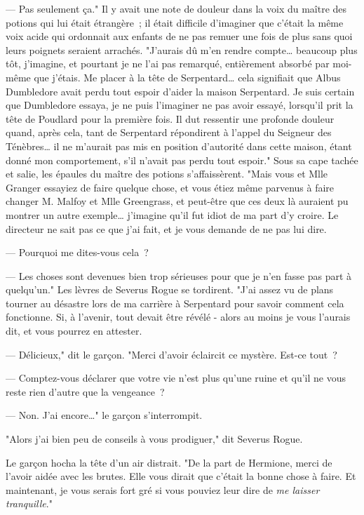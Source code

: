 --- Pas seulement ça." Il y avait une note de douleur dans la voix du maître des potions qui lui était étrangère~; il était difficile d'imaginer que c'était la même voix acide qui ordonnait aux enfants de ne pas remuer une fois de plus sans quoi leurs poignets seraient arrachés. "J'aurais dû m'en rendre compte… beaucoup plus tôt, j'imagine, et pourtant je ne l'ai pas remarqué, entièrement absorbé par moi-même que j'étais. Me placer à la tête de Serpentard… cela signifiait que Albus Dumbledore avait perdu tout espoir d'aider la maison Serpentard. Je suis certain que Dumbledore essaya, je ne puis l'imaginer ne pas avoir essayé, lorsqu'il prit la tête de Poudlard pour la première fois. Il dut ressentir une profonde douleur quand, après cela, tant de Serpentard répondirent à l'appel du Seigneur des Ténèbres… il ne m'aurait pas mis en position d'autorité dans cette maison, étant donné mon comportement, s'il n'avait pas perdu tout espoir." Sous sa cape tachée et salie, les épaules du maître des potions s'affaissèrent. "Mais vous et Mlle Granger essayiez de faire quelque chose, et vous étiez même parvenus à faire changer M. Malfoy et Mlle Greengrass, et peut-être que ces deux là auraient pu montrer un autre exemple… j'imagine qu'il fut idiot de ma part d'y croire. Le directeur ne sait pas ce que j'ai fait, et je vous demande de ne pas lui dire.

--- Pourquoi me dites-vous cela~?

--- Les choses sont devenues bien trop sérieuses pour que je n'en fasse pas part à quelqu'un." Les lèvres de Severus Rogue se tordirent. "J'ai assez vu de plans tourner au désastre lors de ma carrière à Serpentard pour savoir comment cela fonctionne. Si, à l'avenir, tout devait être révélé - alors au moins je vous l'aurais dit, et vous pourrez en attester.

--- Délicieux," dit le garçon. "Merci d'avoir éclaircit ce mystère. Est-ce tout~?

--- Comptez-vous déclarer que votre vie n'est plus qu'une ruine et qu'il ne vous reste rien d'autre que la vengeance~?

--- Non. J'ai encore…" le garçon s'interrompit.

"Alors j'ai bien peu de conseils à vous prodiguer," dit Severus Rogue.

Le garçon hocha la tête d'un air distrait. "De la part de Hermione, merci de l'avoir aidée avec les brutes. Elle vous dirait que c'était la bonne chose à faire. Et maintenant, je vous serais fort gré si vous pouviez leur dire de \emph{me laisser tranquille}."

